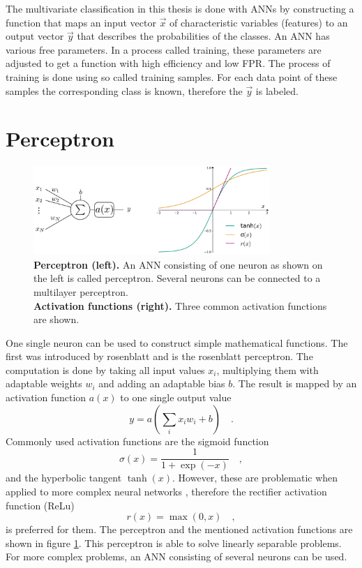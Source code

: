 The multivariate classification in this thesis is done with ANNs by constructing a function that maps an input vector $\vec{x}$ of characteristic variables (features) to an output vector $\vec{y}$ that describes the probabilities of the classes. An ANN has various free parameters. In a process called training, these parameters are adjusted to get a function with high efficiency and low FPR. The process of training is done using so called training samples. For each data point of these samples the corresponding class is known, therefore the $\vec{y}$ is labeled. 

\section{Perceptron} \label{sec:ch_4_perceptron}
\begin{figure}
\centering
\includegraphics[width=0.8\textwidth]{assets/perceptronAndActivation.png}
\caption[Perceptron and Activation Function]{\textbf{Perceptron (left).} An ANN consisting of one neuron as shown on the left is called perceptron. Several neurons can be connected to a multilayer perceptron. \\
\textbf{Activation functions (right).} Three common activation functions are shown.}
\label{fig:ch_4_perceptron}
\end{figure}
One single neuron can be used to construct simple mathematical functions. The first was introduced by rosenblatt and is the rosenblatt perceptron. The computation is done by taking all input values $x_i$, multiplying them with adaptable weights $w_i$ and adding an adaptable bias $b$. The result is mapped by an activation function $a(x)$ to one single output value
\begin{equation}
y = a\left(\sum_i x_i w_i + b\right) \quad .
\end{equation}
Commonly used activation functions are the sigmoid function
\begin{equation}\label{eq:ch4_sigmoid}
\sigma(x) = \frac{1}{1+\exp(-x)}	\quad ,
\end{equation}
and the hyperbolic tangent $\tanh(x)$. However, these are problematic when applied to more complex neural networks \cite{VanishingGradientProblem}, therefore the rectifier activation function (ReLu) \cite{relu}
\begin{equation}\label{eq:ch4_relu}
r(x) = \max(0,x)	\quad ,
\end{equation}
is preferred for them. The perceptron and the mentioned activation functions are shown in figure \ref{fig:ch_4_perceptron}. This perceptron is able to solve linearly separable problems. For more complex problems, an ANN consisting of several neurons can be used.


